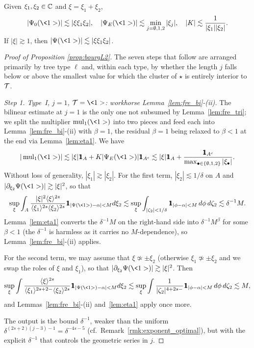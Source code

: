 \begin{lemma}\label{lem:pointwise_multipliers}
Given $\xi_1,\xi_2\in\mathbb{C}$ and $\xi=\xi_1+\xi_2$,
$$
|\Psi_0(\<1>)|\lesssim |\xi\xi_1\xi_2|,\quad  |\Psi_E(\<1>)|\lesssim \min_{j=\emptyset, 1,2}|\xi_j|,\quad |K|\lesssim \frac{1}{|\xi_1||\xi_2|}.
$$
If $|\xi|\gtrsim 1$, then $|\Psi(\<1>)|\lesssim |\xi\xi_1\xi_2|$.
\end{lemma}

\begin{proof}[Proof of Proposition \ref{prop:bourgL2}]
The seven steps that follow are arranged primarily by tree type $\ell$ and, within each type, by whether the length $j$ falls below or above the smallest value for which the cluster of $\star$ is entirely interior to $\mathcal{T}$.

\medskip

\noi\textit{Step 1. Type~I, $j=1$, $\TT=\<1>$: workhorse Lemma~\ref{lem:fre_bi}-(ii).} The bilinear estimate at $j=1$ is the only one not subsumed by Lemma~\ref{lem:fre_tri}; we split the multiplier $\mul_1(\<1>)$ into two pieces and feed each into Lemma~\ref{lem:fre_bi}-(ii) with $\beta=1$, the residual $\beta=1$ being relaxed to $\beta<1$ at the end via Lemma~\ref{lem:eta1}.
We have
$$
|\mul_1(\<1>)|\lesssim |\xi|\ind_A + K|\Psi_E(\<1>)|\ind_{A^c} \lesssim |\xi|\ind_A + \frac{\ind_{A^c}}{\max_{\bul\in\{\emptyset, 1, 2\}}|\xi_\bul|}.
$$
Without loss of generality, $|\xi_1|\gtrsim |\xi_2|$.
For the first term, $|\xi_2|\lesssim 1/\delta$ on $A$ and $|\partial_{\xi_2}\Psi(\<1>)|\gtrsim |\xi|^2$, so that
$$
\sup_\xi \int_A \frac{|\xi|^2\jap{\xi}^{2s}}{\jap{\xi_1}^{2s}\jap{\xi_2}^{2s}} \ind_{|\Psi(\<1>)-\alpha|<M} d\xi_2 \lesssim \sup_\xi \int_{|\zeta_2|<1/\delta}  \ind_{|\phi-\alpha|<M} \,d\phi\, d\zeta_2 \lesssim \delta^{-1}M.
$$
Lemma~\ref{lem:eta1} converts the $\delta^{-1}M$ on the right-hand side into $\delta^{-1}M^\beta$ for some $\beta<1$ (the $\delta^{-1}$ is harmless as it carries no $M$-dependence), so Lemma~\ref{lem:fre_bi}-(ii) applies.

For the second term, we may assume that $\xi\not\simeq \pm \xi_2$ (otherwise $\xi_1\not\simeq \pm \xi_2$ and we swap the roles of $\xi$ and $\xi_1$), so that $|\partial_{\xi_2}\Psi(\<1>)|\gtrsim |\xi|^2$. Then
$$
\sup_\xi \int \frac{\jap{\xi}^{2s}}{\jap{\xi_1}^{2s+2-}\jap{\xi_2}^{2s}} \ind_{|\Psi(\<1>)-\alpha|<M} d\xi_2 \lesssim \sup_\xi \int \frac{1}{|\zeta_2|^{4+2s-}} \ind_{|\phi-\alpha|<M}\,d\phi\, d\zeta_2 \lesssim M,
$$
and Lemmas~\ref{lem:fre_bi}-(ii) and~\ref{lem:eta1} apply once more.

The output is the bound $\delta^{-1}$, weaker than the uniform $\delta^{(2s+2)(j-3)-1}=\delta^{-4s-5}$ (cf.\ Remark~\ref{rmk:exponent_optimal}), but with the explicit $\delta^{-1}$ that controls the geometric series in $j$.


\end{proof}
